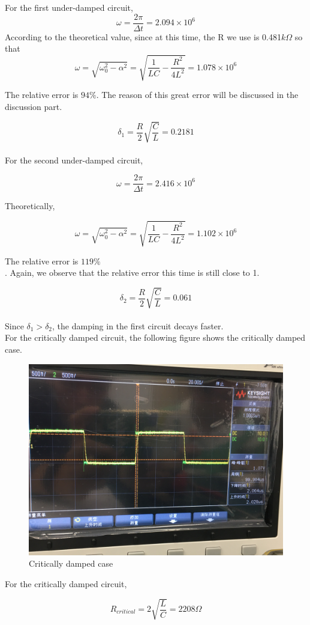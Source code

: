 \documentclass{article}
\begin{document}
For the first under-damped circuit,
$$\omega=\frac{2\pi}{\Delta t}=2.094 \times10^6$$
According to the theoretical value, since at this time, the R we use is 0.481$k\Omega $ so that
$$\omega=\sqrt{\omega_0^2-\alpha^2}=\sqrt{\frac{1}{LC}-\frac{R^2}{4L^2}}=1.078\times10^6$$

The relative error is $94\%$. The reason of this great error will be discussed in the discussion part.

$$\delta_1=\frac{R}{2}\sqrt{\frac{C}{L}}=0.2181$$\\

For the second under-damped circuit,

$$\omega=\frac{2\pi}{\Delta t}=2.416\times10^6$$

Theoretically,

$$\omega=\sqrt{\omega_0^2-\alpha^2}=\sqrt{\frac{1}{LC}-\frac{R^2}{4L^2}}=1.102\times10^6$$

The relative error is $119\%$\\. Again, we observe that the relative error this time is still close to 1.

$$\delta_2=\frac{R}{2}\sqrt{\frac{C}{L}}=0.061$$\\

Since $\delta_1>\delta_2$, the damping in the first circuit decays faster.\\

For the critically damped circuit, the following figure shows the critically damped case.
 
  \begin{figure}[H]
  \centering
  \includegraphics[width=.6\textwidth]{Figure4.jpg}
  \caption{Critically damped case}
  \label{img} 
\end{figure}
For the critically damped circuit,

$$R_{critical}=2\sqrt{\frac{L}{C}}=2208\Omega$$
\end{document}
